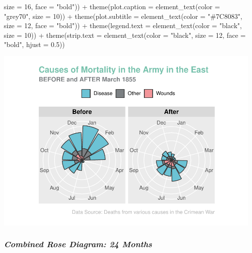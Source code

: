 \documentclass[
  dvipsnames]{article}
\newenvironment{Shaded}{\begin{snugshade}}{\end{snugshade}}
\newcommand{\AttributeTok}[1]{\textcolor[rgb]{0.77,0.63,0.00}{#1}}
\newcommand{\DecValTok}[1]{\textcolor[rgb]{0.00,0.00,0.81}{#1}}
\newcommand{\FloatTok}[1]{\textcolor[rgb]{0.00,0.00,0.81}{#1}}
\newcommand{\FunctionTok}[1]{\textcolor[rgb]{0.00,0.00,0.00}{#1}}
\newcommand{\NormalTok}[1]{#1}
\newcommand{\SpecialCharTok}[1]{\textcolor[rgb]{0.00,0.00,0.00}{#1}}
\newcommand{\StringTok}[1]{\textcolor[rgb]{0.31,0.60,0.02}{#1}}
\begin{document}
\begin{Shaded}
\begin{Highlighting}[]
        \AttributeTok{size =} \DecValTok{16}\NormalTok{, }\AttributeTok{face =} \StringTok{"bold"}\NormalTok{)) }\SpecialCharTok{+} \FunctionTok{theme}\NormalTok{(}\AttributeTok{plot.caption =} \FunctionTok{element\_text}\NormalTok{(}\AttributeTok{color =} \StringTok{"grey70"}\NormalTok{,}
    \AttributeTok{size =} \DecValTok{10}\NormalTok{)) }\SpecialCharTok{+} \FunctionTok{theme}\NormalTok{(}\AttributeTok{plot.subtitle =} \FunctionTok{element\_text}\NormalTok{(}\AttributeTok{color =} \StringTok{"\#7C8083"}\NormalTok{,}
    \AttributeTok{size =} \DecValTok{12}\NormalTok{, }\AttributeTok{face =} \StringTok{"bold"}\NormalTok{)) }\SpecialCharTok{+} \FunctionTok{theme}\NormalTok{(}\AttributeTok{legend.text =} \FunctionTok{element\_text}\NormalTok{(}\AttributeTok{color =} \StringTok{"black"}\NormalTok{,}
    \AttributeTok{size =} \DecValTok{10}\NormalTok{)) }\SpecialCharTok{+} \FunctionTok{theme}\NormalTok{(}\AttributeTok{strip.text =} \FunctionTok{element\_text}\NormalTok{(}\AttributeTok{color =} \StringTok{"black"}\NormalTok{,}
    \AttributeTok{size =} \DecValTok{12}\NormalTok{, }\AttributeTok{face =} \StringTok{"bold"}\NormalTok{, }\AttributeTok{hjust =} \FloatTok{0.5}\NormalTok{))}
\end{Highlighting}
\end{Shaded}

\begin{flushleft}\includegraphics[width=0.9\linewidth]{Byler_Nightingale-Final-Project_Writeup_files/figure-latex/modern rose1-1} \end{flushleft}

\newpage

\hypertarget{combined-rose-diagram-24-months}{%
\subsubsection{\texorpdfstring{\emph{Combined Rose Diagram: 24
Months}}{Combined Rose Diagram: 24 Months}}\label{combined-rose-diagram-24-months}}
\end{document}
